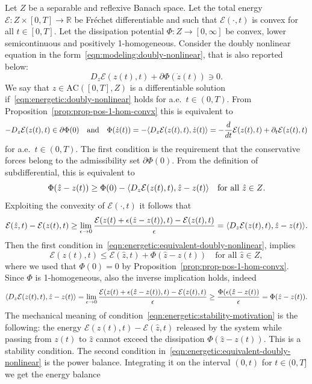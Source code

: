 \documentclass[a4paper,10pt,twoside]{amsbook}
\numberwithin{section}{chapter}
\numberwithin{equation}{chapter}
\theoremstyle{definition}
\DeclarePairedDelimiter{\dual}{\langle}{\rangle}
\begin{document}
Let $Z$ be a separable and reflexive Banach space. Let the total energy $\mathcal{E}\colon Z\times[0,T]\to\mathbb{R}$ be Fréchet differentiable and such that $\mathcal{E}(\cdot,t)$ is convex for all $t\in[0,T]$. Let the dissipation potential $\Phi\colon Z\to[0,\infty]$ be convex, lower semicontinuous and positively 1-homogeneous. Consider the doubly nonlinear equation in the form~\eqref{eqn:modeling:doubly-nonlinear}, that is also reported below:
\begin{equation}
\label{eqn:energetic:doubly-nonlinear}
D_z\mathcal{E}(z(t),t)+\partial\Phi(\dot z(t))\ni 0.
\end{equation}
We say that $z\in\text{AC}([0,T],Z)$ is a differentiable solution if~\eqref{eqn:energetic:doubly-nonlinear} holds for a.e.\ $t\in(0,T)$. From Proposition~\ref{prop:prop-pos-1-hom-convx} this is equivalent to
\begin{equation}
\label{eqn:energetic:equivalent-doubly-nonlinear}
-D_z\mathcal{E}(z(t),t)\in\partial\Phi(0)\quad\text{and}\quad\Phi(\dot z(t))=-\dual{D_z\mathcal{E}(z(t),t),\dot z(t)}=-\frac{d}{dt}\mathcal{E}(z(t),t)+\partial_t\mathcal{E}(z(t),t)
\end{equation}
for a.e.\ $t\in(0,T)$. The first condition is the requirement that the conservative forces belong to the admissibility set $\partial\Phi(0)$. From the definition of subdifferential, this is equivalent to
\[
\Phi(\hat z-z(t))\ge\Phi(0)-\dual{D_z\mathcal{E}(z(t),t),\hat z-z(t)}\quad\text{for all $\hat{z}\in Z$}.
\]
Exploiting the convexity of $\mathcal{E}(\cdot,t)$ it follows that
\[
\mathcal{E}(\hat{z},t)-\mathcal{E}(z(t),t)\ge\lim_{\epsilon\to 0}\frac{\mathcal{E}(z(t)+\epsilon(\hat{z}-z(t)),t)-\mathcal{E}(z(t),t)}{\epsilon}=\dual{D_z\mathcal{E}(z(t),t),\hat{z}-z(t)}.
\]
Then the first condition in~\eqref{eqn:energetic:equivalent-doubly-nonlinear}, implies
\begin{equation}
\label{eqn:energetic:stability-motivation}
\mathcal{E}(z(t),t)\le\mathcal{E}(\hat{z},t)+\Phi(\hat{z}-z(t))\quad\text{for all $\hat{z}\in Z$},
\end{equation}
where we used that $\Phi(0)=0$ by Proposition~\ref{prop:prop-pos-1-hom-convx}. Since $\Phi$ is 1-homogeneous, also the inverse implication holds, indeed
\[
\dual{D_z\mathcal{E}(z(t),t),\hat{z}-z(t)}=\lim_{\epsilon\to 0}\frac{\mathcal{E}(z(t)+\epsilon(\hat{z}-z(t)),t)-\mathcal{E}(z(t),t)}{\epsilon}\ge\frac{\Phi(\epsilon(\hat{z}-z(t))}{\epsilon}=\Phi(\hat{z}-z(t)).
\]
The mechanical meaning of condition~\eqref{eqn:energetic:stability-motivation} is the following: the energy $\mathcal{E}(z(t),t)-\mathcal{E}(\hat{z},t)$ released by the system while passing from $z(t)$ to $\hat{z}$ cannot exceed the dissipation $\Phi(\hat{z}-z(t))$. This is a stability condition. The second condition in~\eqref{eqn:energetic:equivalent-doubly-nonlinear} is the power balance. Integrating it on the interval $(0,t)$ for $t\in(0,T]$ we get the energy balance
\end{document}
